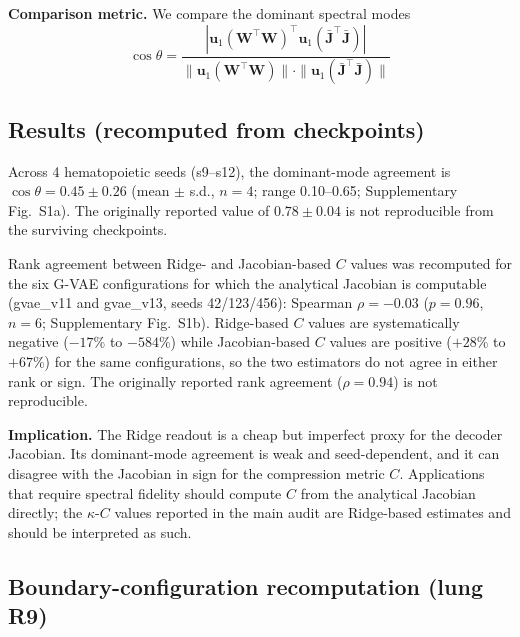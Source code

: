 \documentclass[11pt,a4paper]{article}
\newcommand{\Wmat}{\mathbf{W}}\newcommand{\Jmat}{\mathbf{J}}
\begin{document}
\textbf{Comparison metric.} We compare the dominant spectral modes \begin{equation}
\cos\theta = \frac{|\mathbf{u}_1(\Wmat^\top\Wmat)^\top \mathbf{u}_1(\bar{\Jmat}^\top\bar{\Jmat})|}{\|\mathbf{u}_1(\Wmat^\top\Wmat)\| \cdot \|\mathbf{u}_1(\bar{\Jmat}^\top\bar{\Jmat})\|}
\end{equation}

\subsection*{Results (recomputed from checkpoints)}

Across 4 hematopoietic seeds (s9--s12), the dominant-mode agreement is $\cos\theta = 0.45 \pm 0.26$ (mean $\pm$ s.d., $n=4$; range 0.10--0.65; Supplementary Fig.~S1a). The originally reported value of $0.78\pm0.04$ is not reproducible from the surviving checkpoints.

Rank agreement between Ridge- and Jacobian-based $C$ values was recomputed for the six G-VAE configurations for which the analytical Jacobian is computable (gvae\_v11 and gvae\_v13, seeds 42/123/456): Spearman $\rho = -0.03$ ($p=0.96$, $n=6$; Supplementary Fig.~S1b). Ridge-based $C$ values are systematically negative ($-17\%$ to $-584\%$) while Jacobian-based $C$ values are positive ($+28\%$ to $+67\%$) for the same configurations, so the two estimators do not agree in either rank or sign. The originally reported rank agreement ($\rho=0.94$) is not reproducible.

\textbf{Implication.} The Ridge readout is a cheap but imperfect proxy for the decoder Jacobian. Its dominant-mode agreement is weak and seed-dependent, and it can disagree with the Jacobian in sign for the compression metric $C$. Applications that require spectral fidelity should compute $C$ from the analytical Jacobian directly; the $\kappa$-$C$ values reported in the main audit are Ridge-based estimates and should be interpreted as such.

\subsection*{Boundary-configuration recomputation (lung R9)}
\end{document}
